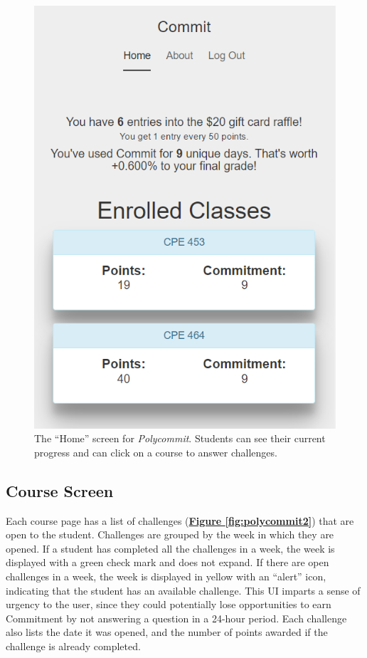 \begin{figure}[h]
	\includegraphics{figures/polycommit-screen}
	\caption{The ``Home'' screen for \textit{Polycommit}. Students can see their current progress and can click on a course to answer challenges.}
	\label{fig:polycommit1}
\end{figure}

\subsection{Course Screen}
\par Each course page has a list of challenges (\textbf{\hyperref[fig:polycommit2]{Figure \ref*{fig:polycommit2}}}) that are open to the student. Challenges are grouped by the week in which they are opened. If a student has completed all the challenges in a week, the week is displayed with a green check mark and does not expand. If there are open challenges in a week, the week is displayed in yellow with an ``alert'' icon, indicating that the student has an available challenge. This UI imparts a sense of urgency to the user, since they could potentially lose opportunities to earn Commitment by not answering a question in a 24-hour period. Each challenge also lists the date it was opened, and the number of points awarded if the challenge is already completed.

